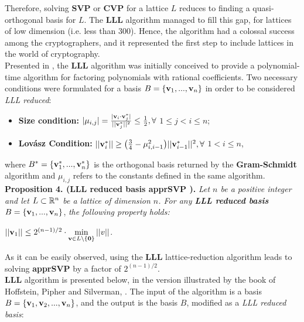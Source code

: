 Therefore, solving \textbf{SVP} or \textbf{CVP} for a lattice $L$ reduces to finding a quasi-orthogonal basis for $L$. The \textbf{LLL} algorithm managed to fill this gap, for lattices of low dimension (i.e. less than 300). Hence, the algorithm had a colossal success among the cryptographers, and it represented the first step to include lattices in the world of cryptography.\\

Presented in \cite{LLL82}, the \textbf{LLL} algorithm was initially conceived to provide a polynomial-time algorithm for factoring polynomials with rational coefficients. Two necessary conditions were formulated for a basis $B = \{\textbf{v}_1, ..., \textbf{v}_n\}$ in order to be considered \textit{LLL reduced}:

\begin{itemize}
	\item \textbf{Size condition:} $|\mu_{i,j}| =  \frac{|\textbf{v}_i \cdot \textbf{v}_j^*|}{||\textbf{v}_j^*||^2} \leq \frac{1}{2}, \forall$ $ 1 \leq j < i \leq n$;
	
	\item \textbf{Lov\'asz Condition:} $|| \textbf{v}_i^* || \geq \big( \frac{3}{4} - \mu_{i,i-1}^2 \big) ||\textbf{v}_{i-1}^*||^2, \forall $ $1 < i \leq n$,
\end{itemize}
where $B^* = \{\textbf{v}_1^*, ..., \textbf{v}_n^*\}$ is the orthogonal basis returned by the \textbf{Gram-Schmidt} algorithm and $\mu_{i,j}$ refers to the constants defined in the same algorithm.\\

\textbf{Proposition 4. (LLL reduced basis apprSVP \cite{HPS08}).} \textit{ Let $n$ be a positive integer and let $L \subset \mathbb{R}^n$ be a lattice of dimension $n$. For any \textbf{LLL reduced basis}} $B = \{\textbf{v}_1,...,\textbf{v}_n\}$, \textit{the following property holds:}
\begin{center}
	$||\textbf{v}_1|| \leq 2^{(n-1) / 2} \cdot \displaystyle{\min_{\textbf{v}\in L \backslash \{\textbf{0}\}} || v||}$.
\end{center}

As it can be easily observed, using the \textbf{LLL} lattice-reduction algorithm leads to solving \textbf{apprSVP} by a factor of $2^{(n-1)/2}$. \\

\textbf{LLL} algorithm is presented below, in the version illustrated by the book of Hoffstein, Pipher and Silverman, \cite{HPS08}. The input of the algorithm is a basis $B = \{\textbf{v}_1,\textbf{v}_2,...,\textbf{v}_n\}$, and the output is the basis $B$, modified as a \textit{LLL reduced basis}: \\

